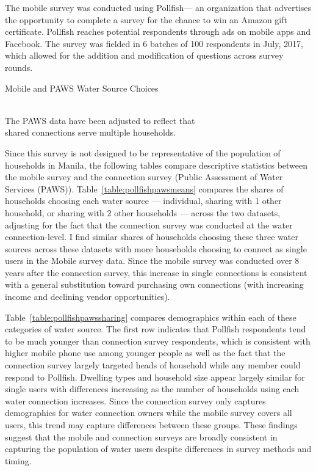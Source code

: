\documentclass[12pt]{article}
\begin{document}
\begin{appendices}
The mobile survey was conducted using Pollfish--- an organization that advertises the opportunity to complete a survey for the chance to win an Amazon gift certificate.  Pollfish reaches potential respondents through ads on mobile apps and Facebook.  The survey was fielded in 6 batches of 100 respondents in July, 2017, which allowed for the addition and modification of questions across survey rounds.  

\begin{table}
\centering
\caption{Mobile and PAWS Water Source Choices}\label{table:pollfishpawsmeans}
 \\
\vspace{.3cm}
\footnotesize{The PAWS data have been adjusted to reflect that \\ shared connections serve multiple households.}
\end{table}

Since this survey is not designed to be representative of the population of households in Manila, the following tables compare descriptive statistics between the mobile survey and the connection  survey (Public Assessment of Water Services (PAWS)).  Table~\ref{table:pollfishpawsmeans} compares the shares of households choosing each water source --- individual, sharing with 1 other household, or sharing with 2 other households --- across the two datasets, adjusting for the fact that the connection survey was conducted at the water connection-level.  I find similar shares of households choosing these three water sources across these datasets with more households choosing to connect as single users in the Mobile survey data.  Since the mobile survey was conducted over 8 years after the connection survey, this increase in single connections is consistent with a general substitution toward purchasing own connections (with increasing income and declining vendor opportunities).

Table~\ref{table:pollfishpawssharing} compares demographics within each of these categories of water source.  The first row indicates that Pollfish respondents tend to be much younger than connection survey respondents, which is consistent with higher mobile phone use among younger people as well as the fact that the connection survey largely targeted heads of household while any member could respond to Pollfish.  Dwelling types and household size appear largely similar for single users with differences increasing as the number of households using each water connection increases.  Since the connection survey only captures demographics for water connection owners while the mobile survey covers all users, this trend may capture differences between these groups.  These findings suggest that the mobile and connection surveys are broadly consistent in capturing the population of water users despite differences in survey methods and timing.


\end{appendices}
\end{document}
